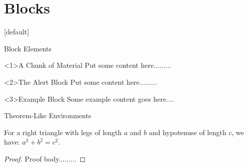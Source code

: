 \documentclass[hideallsubsections]{beamer}
\begin{document}
	\section{Blocks}
	\frame{\tableofcontents[currentsection]}
	{ %
	[default]
	\begin{frame}{Block Elements}
		\begin{block}<1>{A Chunk of Material}
			Put some content here.........
		\end{block}
		\begin{alertblock}<2>{The Alert Block}
			Put some content here.........
		\end{alertblock}
		\begin{exampleblock}<3>{Example Block}
			Some example content goes here....
		\end{exampleblock}
	\end{frame}
	} %
	
	\begin{frame}{Theorem-Like Environments}
		\begin{theorem}
			For a right triangle with legs of length 					$a$ and $b$ and hypotenuse of length $c$, 					we have: $a^2 + b^2 = c^2$.
		\end{theorem} 
		\begin{proof}
    		Proof body.........
  		\end{proof}
	\end{frame}
	
\end{document}

